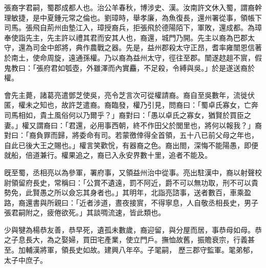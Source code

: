\begin{pinyinscope}
 
 
 張裔字君嗣，蜀郡成都人也。治公羊春秋，博涉史、漢。汝南許文休入蜀，謂裔幹理敏捷，是中夏鍾元常之倫也。劉璋時，舉孝廉，為魚復長，還州署從事，領帳下司馬。張飛自荊州由墊江入，璋授裔兵，拒張飛於德陽陌下，軍敗，還成都。為璋奉使詣先主，先主許以禮其君而安其人也，裔還，城門乃開。先主以裔為巴郡太守，還為司金中郎將，典作農戰之器。先是，益州郡殺太守正昂，耆率雍闓恩信著於南土，使命周旋，遠通孫權。乃以裔為益州太守，徑往至郡。闓遂趑趄不賔，假鬼教曰：「張府君如瓠壺，外雖澤而內實麤，不足殺，令縛與吳。」於是遂送裔於權。
 
 
 
 
 會先主薨，諸葛亮遣鄧芝使吳，亮令芝言次可從權請裔。裔自至吳數年，流徙伏匿，權未之知也，故許芝遣裔。裔臨發，權乃引見，問裔曰：「蜀卓氏寡女，亡奔司馬相如，貴土風俗何以乃爾乎？」裔對曰：「愚以卓氏之寡女，猶賢於買臣之妻。」權又謂裔曰：「君還，必用事西朝，終不作田父於閭里也，將何以報我？」裔對曰：「裔負罪而歸，將委命有司。若蒙徼倖得全首領，五十八已前父母之年也，自此已後大王之賜也。」權言笑歡恱，有器裔之色。裔出閤，深悔不能陽愚，即便就船，倍道兼行。權果追之，裔已入永安界數十里，追者不能及。
 
 
 
 
 旣至蜀，丞相亮以為參軍，署府事，又領益州治中從事。亮出駐漢中，裔以射聲校尉領留府長史，常稱曰：「公賞不遺遠，罰不阿近，爵不可以無功取，刑不可以貴勢免，此賢愚之所以僉忘其身者也。」其明年，北詣亮諮事，送者數百，車乘盈路，裔還書與所親曰：「近者涉道，晝夜接賔，不得寧息，人自敬丞相長史，男子張君嗣附之，疲倦欲死。」其談啁流速，皆此類也。
 
 
 少與犍為楊恭友善，恭早死，遺孤未數歲，裔迎留，與分屋而居，事恭母如母。恭之子息長大，為之娶婦，買田宅產業，使立門戶。撫恤故舊，振贍衰宗，行義甚至。加輔漢將軍，領長史如故。建興八年卒。子毣嗣，
 歷三郡守監軍。毣弟郁，太子中庶子。
 
 
\end{pinyinscope}